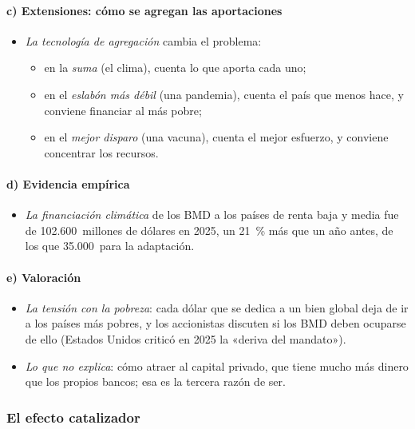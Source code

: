 \documentclass[11pt]{article}
\begin{document}
\paragraph{c) Extensiones: cómo se agregan las aportaciones}

\begin{itemize}
\item \emph{La tecnología de agregación} cambia el problema\nocite{Hirshleifer1983Weakest}:
  \begin{itemize}
  \item en la \emph{suma} (el clima), cuenta lo que aporta cada uno;
  \item en el \emph{eslabón más débil} (una pandemia), cuenta el país que menos hace, y conviene financiar al más pobre;
  \item en el \emph{mejor disparo} (una vacuna), cuenta el mejor esfuerzo, y conviene concentrar los recursos.
  \end{itemize}
\end{itemize}

\paragraph{d) Evidencia empírica}

\begin{itemize}
\item \emph{La financiación climática} de los BMD a los países de renta baja y media fue de 102.600~millones de dólares en 2025, un 21~\% más que un año antes, de los que 35.000~para la adaptación\nocite{MDB2026Clima}.
\end{itemize}

\paragraph{e) Valoración}

\begin{itemize}
\item \emph{La tensión con la pobreza}: cada dólar que se dedica a un bien global deja de ir a los países más pobres, y los accionistas discuten si los BMD deben ocuparse de ello (Estados Unidos criticó en 2025 la «deriva del mandato»)\nocite{TesoroEEUU2025Bessent}.
\item \emph{Lo que no explica}: cómo atraer al capital privado, que tiene mucho más dinero que los propios bancos; esa es la tercera razón de ser.
\end{itemize}

\subsubsection{El efecto catalizador}\label{sec:catalizador}
\end{document}
